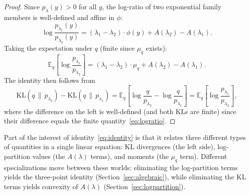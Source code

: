 \documentclass[11pt, a4paper, 
onecolumn, 
showabstract]{naverlabseurope-onecol-flex}
\theoremstyle{definition}
\theoremstyle{remark}
\newcommand{\KL}[2]{\mathrm{KL}\!\left(#1 \,\|\, #2\right)}
\newcommand{\E}{\mathbb{E}}
\begin{document}
\begin{proof}
Since $p_\lambda(y) > 0$ for all $y$, the log-ratio of two exponential family members is well-defined and affine in $\phi$:
\[
    \log \frac{p_{\lambda_1}(y)}{p_{\lambda_2}(y)}
    = (\lambda_1 - \lambda_2) \cdot \phi(y) + A(\lambda_2) - A(\lambda_1).
\]
Taking the expectation under $q$ (finite since $\mu_q$ exists):
\begin{equation}\label{eq:logratio}
    \E_q\!\left[\log \frac{p_{\lambda_1}}{p_{\lambda_2}}\right]
    = (\lambda_1 - \lambda_2) \cdot \mu_q + A(\lambda_2) - A(\lambda_1).
\end{equation}
The identity then follows from
\[
    \KL{q}{p_{\lambda_2}} - \KL{q}{p_{\lambda_1}}
    = \E_q\!\left[\log \frac{q}{p_{\lambda_2}} - \log \frac{q}{p_{\lambda_1}}\right]
    = \E_q\!\left[\log \frac{p_{\lambda_1}}{p_{\lambda_2}}\right],
\]
where the difference on the left is well-defined (and both KLs are finite) since their difference equals the finite quantity~\eqref{eq:logratio}.
\end{proof}

Part of the interest of identity~\eqref{eq:identity} is that it relates three different types of quantities in a single linear equation: KL divergences (the left side), log-partition values (the $A(\lambda)$ terms), and moments (the $\mu_q$ term).
Different specializations move between these worlds: eliminating the log-partition terms yields the three-point identity (Section~\ref{sec:algebraic}), while eliminating the KL terms yields convexity of $A(\lambda)$ (Section~\ref{sec:logpartition}).
\end{document}
